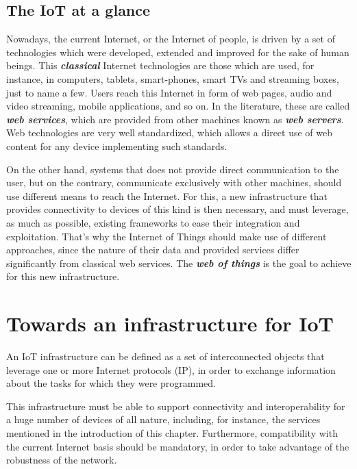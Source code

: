 \subsection{The IoT at a glance}
\label{subsec:IoTAtAGlance}
Nowadays, the current Internet, or the Internet of people, is driven by a set of technologies which were developed, extended and improved for the sake of human beings.
This \textit{\textbf{classical}} Internet technologies are those which are used, for instance, in computers, tablets, smart-phones, smart TVs and streaming boxes, just to name a few.
Users reach this Internet in form of web pages, audio and video streaming, mobile applications, and so on.
In the literature, these are called \textit{\textbf{web services}}, which are provided from other machines known as \textit{\textbf{web servers}}.
Web technologies are very well standardized, which allows a direct use of web content for any device implementing such standards.

On the other hand, systems that does not provide direct communication to the user, but on the contrary, communicate exclusively with other machines, should use different means to reach the Internet.
For this, a new infrastructure that provides connectivity to devices of this kind is then necessary, and must leverage, as much as possible, existing frameworks to ease their integration and exploitation.
That's why the Internet of Things should make use of different approaches, since the nature of their data and provided services differ  significantly from classical web services.
The \textit{\textbf{web of things}}\cite{duquennoy2009webofthings} is the goal to achieve for this new infrastructure.

\section{Towards an infrastructure for IoT}
\label{sec:IoTInfra}
An IoT infrastructure can be defined as a set of interconnected objects that leverage one or more Internet protocols (IP), in order to exchange information about the tasks for which they were programmed.

This infrastructure must be able to support connectivity and interoperability for a huge number of devices of all nature, including, for instance, the services mentioned in the introduction of this chapter.
Furthermore, compatibility with the current Internet basis should be mandatory, in order to take advantage of the robustness of the network.

